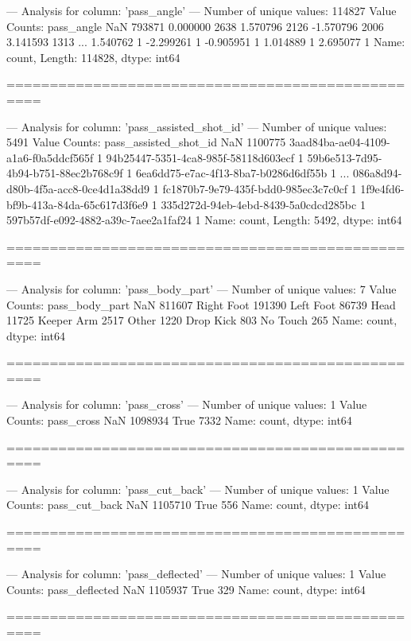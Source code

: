 --- Analysis for column: 'pass_angle' ---
Number of unique values: 114827
Value Counts:
pass_angle
 NaN         793871
 0.000000      2638
 1.570796      2126
-1.570796      2006
 3.141593      1313
              ...  
 1.540762         1
-2.299261         1
-0.905951         1
 1.014889         1
 2.695077         1
Name: count, Length: 114828, dtype: int64

==================================================

--- Analysis for column: 'pass_assisted_shot_id' ---
Number of unique values: 5491
Value Counts:
pass_assisted_shot_id
NaN                                     1100775
3aad84ba-ae04-4109-a1a6-f0a5ddcf565f          1
94b25447-5351-4ca8-985f-58118d603ecf          1
59b6e513-7d95-4b94-b751-88ec2b768c9f          1
6ea6dd75-e7ac-4f13-8ba7-b0286d6df55b          1
                                         ...   
086a8d94-d80b-4f5a-acc8-0ce4d1a38dd9          1
fc1870b7-9e79-435f-bdd0-985ec3c7c0cf          1
1f9e4fd6-bf9b-413a-84da-65c617d3f6e9          1
335d272d-94eb-4ebd-8439-5a0cdcd285bc          1
597b57df-e092-4882-a39c-7aee2a1faf24          1
Name: count, Length: 5492, dtype: int64

==================================================

--- Analysis for column: 'pass_body_part' ---
Number of unique values: 7
Value Counts:
pass_body_part
NaN           811607
Right Foot    191390
Left Foot      86739
Head           11725
Keeper Arm      2517
Other           1220
Drop Kick        803
No Touch         265
Name: count, dtype: int64

==================================================

--- Analysis for column: 'pass_cross' ---
Number of unique values: 1
Value Counts:
pass_cross
NaN     1098934
True       7332
Name: count, dtype: int64

==================================================

--- Analysis for column: 'pass_cut_back' ---
Number of unique values: 1
Value Counts:
pass_cut_back
NaN     1105710
True        556
Name: count, dtype: int64

==================================================

--- Analysis for column: 'pass_deflected' ---
Number of unique values: 1
Value Counts:
pass_deflected
NaN     1105937
True        329
Name: count, dtype: int64

==================================================

